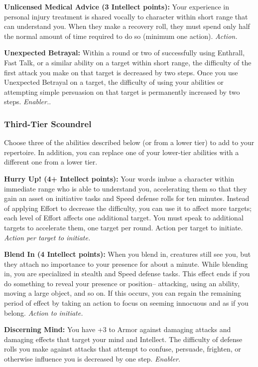 \documentclass[a4paper,10pt,final,twocolumn,oneside]{book}
\newcommand{\itemAbility}[2]{\textcolor{25gray}{\textbullet\textbf{ #1:}}{ #2}\par}
\newcommand{\enabler}{\textit{ Enabler.}}
\newcommand{\action}{\textit{ Action.}}
\newcommand{\actionInit}{\textit{ Action to initiate.}}
\newcommand{\actionInitTarget}{\textit{ Action per target to initiate.}}
\begin{document}
\itemAbility{Unlicensed Medical Advice (3 Intellect points)}{Your experience in personal injury treatment is shared vocally to character within short range that can understand you. When they make a recovery roll, they must spend only half the normal amount of time required to do so (minimum one action).\action}

\itemAbility{Unexpected Betrayal}{Within a round or two of successfully using Enthrall, Fast Talk, or a similar ability on a target within short range, the difficulty of the first attack you make on that target is decreased by two steps. Once you use Unexpected Betrayal on a target, the difficulty of using your abilities or attempting simple persuasion on that target is permanently increased by two steps.\enabler.}


\subsubsection*{Third-Tier Scoundrel}
\label{subsub:scoundrelThirdTier}

Choose three of the abilities described below (or from a lower tier) to add to your repertoire. In addition, you can replace one of your lower-tier abilities with a different one from a lower tier.

\itemAbility{Hurry Up! (4+ Intellect points)}{Your words imbue a character within immediate range who is able to understand you, accelerating them so that they gain an asset on initiative tasks and Speed defense rolls for ten minutes. Instead of applying Effort to decrease the difficulty, you can use it to affect more targets; each level of Effort affects one additional target. You must speak to additional targets to accelerate them, one target per round. Action per target to initiate.\actionInitTarget}

\itemAbility{Blend In (4 Intellect points)}{When you blend in, creatures still see you, but they attach no importance to your presence for about a minute. While blending in, you are specialized in stealth and Speed defense tasks. This effect ends if you do something to reveal your presence or position-- attacking, using an ability, moving a large object, and so on. If this occurs, you can regain the remaining period of effect by taking an action to focus on seeming innocuous and as if you belong.\actionInit}

\itemAbility{Discerning Mind}{You have +3 to Armor against damaging attacks and damaging effects that target your mind and Intellect. The difficulty of defense rolls you make against attacks that attempt to confuse, persuade, frighten, or otherwise influence you is decreased by one step.\enabler}
\end{document}
